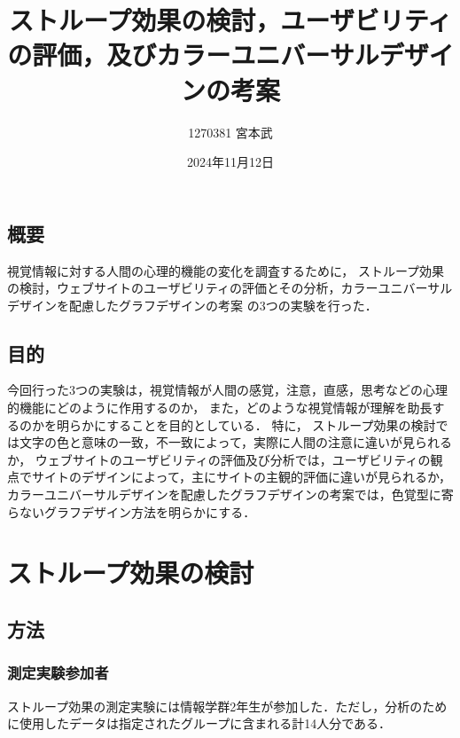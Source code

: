 \documentclass[titlepage]{jlreq}
\title{ストループ効果の検討，ユーザビリティの評価，及びカラーユニバーサルデザインの考案}
\author{1270381 宮本武}
\date{2024年11月12日}
\begin{document}
\maketitle
\begin{center}
    \section*{概要}
\end{center}

視覚情報に対する人間の心理的機能の変化を調査するために，
ストループ効果の検討，ウェブサイトのユーザビリティの評価とその分析，カラーユニバーサルデザインを配慮したグラフデザインの考案
の3つの実験を行った．


\begin{center}
    \section*{目的}
\end{center}

今回行った3つの実験は，視覚情報が人間の感覚，注意，直感，思考などの心理的機能にどのように作用するのか，
また，どのような視覚情報が理解を助長するのかを明らかにすることを目的としている．
特に，
ストループ効果の検討では文字の色と意味の一致，不一致によって，実際に人間の注意に違いが見られるか，
ウェブサイトのユーザビリティの評価及び分析では，ユーザビリティの観点でサイトのデザインによって，主にサイトの主観的評価に違いが見られるか，
カラーユニバーサルデザインを配慮したグラフデザインの考案では，色覚型に寄らないグラフデザイン方法を明らかにする．




\section{ストループ効果の検討}

\subsection{方法}


\subsubsection{測定実験参加者}
ストループ効果の測定実験には情報学群2年生が参加した．ただし，分析のために使用したデータは指定されたグループに含まれる計14人分である．
\end{document}

